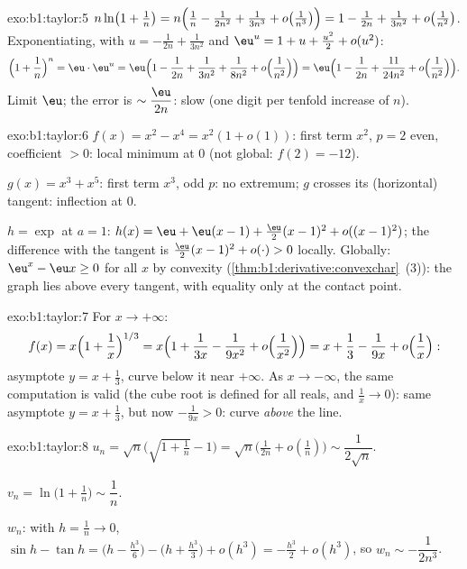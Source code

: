 \begin{solution}{exo:b1:taylor:5}
$n\ln\bigl(1 + \frac1n\bigr) = n\Bigl(\frac1n - \frac{1}{2n^2} +
\frac{1}{3n^3} + o\bigl(\frac{1}{n^3}\bigr)\Bigr) = 1 - \frac{1}{2n}
+ \frac{1}{3n^2} + o\bigl(\frac{1}{n^2}\bigr)$. Exponentiating, with
$u = -\frac{1}{2n} + \frac{1}{3n^2}$ and $\eu^u = 1 + u + \frac{u^2}2
+ o(u^2)$:
\[
\Bigl(1 + \frac1n\Bigr)^n = \eu\cdot \eu^{u}
= \eu\Bigl(1 - \frac{1}{2n} + \frac{1}{3n^2} + \frac{1}{8n^2}
+ o\Bigl(\frac{1}{n^2}\Bigr)\Bigr)
= \eu\Bigl(1 - \frac{1}{2n} + \frac{11}{24n^2} +
o\Bigl(\frac{1}{n^2}\Bigr)\Bigr).
\]
Limit $\eu$; the error is $\sim \dfrac{\eu}{2n}$: slow (one digit per
tenfold increase of $n$).
\end{solution}

\begin{solution}{exo:b1:taylor:6}
$f(x) = x^2 - x^4 = x^2(1 + o(1))$: first term $x^2$, $p = 2$ even,
coefficient $> 0$: local minimum at $0$ (not global: $f(2) = -12$).

$g(x) = x^3 + x^5$: first term $x^3$, odd $p$: no extremum; $g$
crosses its (horizontal) tangent: inflection at $0$.

$h = \exp$ at $a = 1$: $h(x) = \eu + \eu(x-1) + \frac{\eu}{2}(x-1)^2
+ o((x-1)^2)$; the difference with the tangent is
$\frac{\eu}{2}(x-1)^2 + o(\cdot) > 0$ locally. Globally: $\eu^x -
\eu x \geq 0$ for all $x$ by convexity
(\cref{thm:b1:derivative:convexchar}~(3)): the graph lies above every
tangent, with equality only at the contact point.
\end{solution}

\begin{solution}{exo:b1:taylor:7}
For $x \to +\infty$:
\[
f(x) = x\Bigl(1 + \frac1x\Bigr)^{1/3}
= x\Bigl(1 + \frac{1}{3x} - \frac{1}{9x^2} +
o\Bigl(\frac{1}{x^2}\Bigr)\Bigr)
= x + \frac13 - \frac{1}{9x} + o\Bigl(\frac1x\Bigr):
\]
asymptote $y = x + \frac13$, curve below it near $+\infty$. As $x
\to -\infty$, the same computation is valid (the cube root is
defined for all reals, and $\frac1x \to 0$): same asymptote $y = x +
\frac13$, but now $-\frac{1}{9x} > 0$: curve \emph{above} the line.
\end{solution}

\begin{solution}{exo:b1:taylor:8}
$u_n = \sqrt n\bigl(\sqrt{1 + \tfrac1n} - 1\bigr) = \sqrt
n\bigl(\frac{1}{2n} + o(\frac1n)\bigr) \sim \dfrac{1}{2\sqrt n}$.

$v_n = \ln\bigl(1 + \frac1n\bigr) \sim \dfrac 1n$.

$w_n$: with $h = \frac1n \to 0$, $\sin h - \tan h = \bigl(h -
\frac{h^3}{6}\bigr) - \bigl(h + \frac{h^3}{3}\bigr) + o(h^3) =
-\frac{h^3}{2} + o(h^3)$, so $w_n \sim -\dfrac{1}{2n^3}$.
\end{solution}

